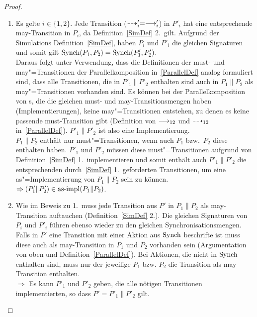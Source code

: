 \begin{proof}\mbox{}
  \begin{enumerate}
    \item Es gelte $i\in\{1,2\}$. Jede Transition ($\may '_i =\must '_i$) in
      $P'_i$ hat eine entsprechende may-Transition in $P_i$, da
      Definition~\ref{SimDef} 2.\ gilt. Aufgrund der Simulations
      Definition~\ref{SimDef}, haben $P_i$ und $P'_i$ die gleichen Signaturen
      und somit gilt $\mathrm{Synch} (P_1,P_2) =\mathrm{Synch} (P'_1,P'_2)$.\\
      Daraus folgt unter Verwendung, dass die Definitionen der must- und
      may"=Transitionen der Parallelkomposition in~\ref{ParallelDef} analog
      formuliert sind, dass alle Transitionen, die in $P'_1\|P'_2$ enthalten
      sind auch in $P_1\|P_2$ als may"=Transitionen vorhanden sind. Es können
      bei der Parallelkomposition von \MEIO{}s, die die gleichen must- und
      may-Transitionsmengen haben (Implementierungen), keine may"=Transitionen
      entstehen, zu denen es keine passende must-Transition gibt (Definition
      von $\must _{12}$ und $\may _{12}$ in~\ref{ParallelDef}). $P'_1\|P'_2$
      ist also eine Implementierung.\\
      $P_1\|P_2$ enthält nur must"=Transitionen, wenn auch $P_1$ bzw.\ $P_2$
      diese enthalten haben. $P'_1$ und $P'_2$ müssen diese must"=Transitionen
      aufgrund von Definition~\ref{SimDef} 1.\ implementieren und somit enthält auch
      $P'_1\|P'_2$ die entsprechenden durch~\ref{SimDef} 1.\ geforderten
      Transitionen, um eine as"=Implementierung von $P_1\|P_2$ sein zu können.\\
      $\Rightarrow (P'_1\|P'_2)\in\mathrm{as}\text{-}\mathrm{impl} (P_1\|P_2)$.
    \item Wie im Beweis zu 1.\ muss jede Transition aus $P'$ in $P_1\|P_2$ als
      may-Transition auftauchen (Definition~\ref{SimDef} 2.). Die gleichen
      Signaturen von $P_i$ und $P'_i$ führen ebenso wieder zu den gleichen
      Synchronisationsmengen.\\
      Falls in $P'$ eine Transition mit einer Aktion aus $\mathrm{Synch}$ beschrifte
      ist muss diese auch als may-Transition in $P_1$ und $P_2$ vorhanden sein
      (Argumentation von oben und Definition~\ref{ParallelDef}). Bei Aktionen,
      die nicht in $\mathrm{Synch}$ enthalten sind, muss nur der jeweilige \MEIO{}
      $P_1$ bzw. $P_2$ die Transition als may-Transition enthalten.\\
      $\Rightarrow$ Es kann $P'_1$ und $P'_2$ geben, die alle nötigen
      Transitionen implementierten, so dass $P'=P'_1\|P'_2$ gilt.\\

\end{enumerate}
\end{proof}
